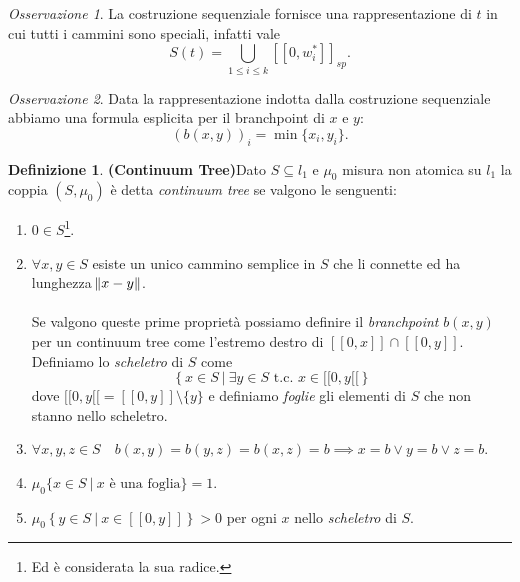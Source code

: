 \documentclass[11pt, twoside]{report}
\theoremstyle{definition}
\newtheorem{definizione}{Definizione}[chapter]
\theoremstyle{plain}
\theoremstyle{remark}
\newtheorem{oss}{Osservazione}[chapter]
\numberwithin{equation}{chapter}
\begin{document}
\begin{oss}
La costruzione sequenziale fornisce una rappresentazione di $t$ in cui tutti i cammini sono speciali, infatti vale
\begin{equation}
S(t)=\bigcup\limits_{1\leq i \leq k} [[0,w_i^*]]_{sp}.
\end{equation}
\end{oss}
\begin{oss} \label{oss_branchpoint}
Data la rappresentazione indotta dalla costruzione sequenziale abbiamo una formula esplicita per il branchpoint di $x$ e $y$:
\begin{equation} 
(b(x,y))_i=\min\{x_i, y_i\}.
\end{equation}
\end{oss}
\begin{definizione}{\textbf{(Continuum Tree)}}\label{def_CT}
Dato $S \subseteq l_1$ e $\mu_0$ misura non atomica su $l_1$ la coppia $(S,\mu_0)$ è detta \textit{continuum tree} se valgono le senguenti:
\begin{enumerate}
\item $0 \in S$\footnote{Ed è considerata la sua radice.}.

\item$\forall x, y \in S$ esiste un unico cammino semplice in $S$ che li connette ed ha lunghezza $\norm{x-y}$.\\
\\
Se valgono queste prime proprietà possiamo definire il \textit{branchpoint} $b(x,y)$ per un continuum tree come l'estremo destro di $[[0,x]]\cap [[0,y]]$.\\
Definiamo lo \textit{scheletro} di $S$ come 
$$\left\{x\in S \ | \ \exists y \in S \text{ t.c. } x\in [[0,y[[\right\}$$
 dove $[[0,y[[=[[0,y]]\setminus \{y\}$ e definiamo \textit{foglie} gli elementi di $S$ che non stanno nello scheletro.



\item $\forall x,y,z \in S \quad b(x,y)=b(y,z)=b(x,z)=b \implies x=b \lor y=b \lor z=b$.

\item $\mu_0\{x\in S \ | \ x \text{ è una foglia}\}=1$.

\item $\mu_0\left\{y\in S \ | \ x\in [[0,y]]\right\}>0$ per ogni $x$ nello \textit{scheletro} di $S$. 

\end{enumerate}   
\end{definizione}
\end{document}

